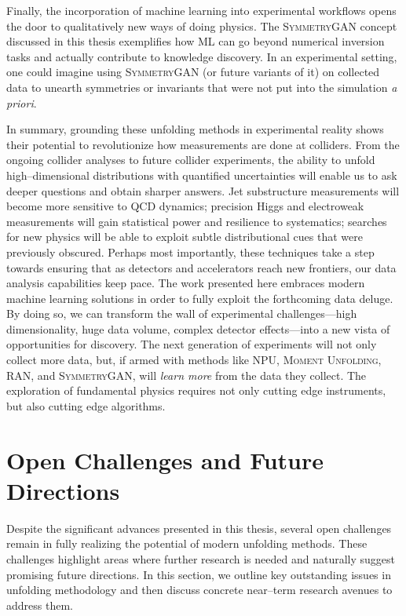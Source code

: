         Finally, the incorporation of machine learning into experimental workflows opens the door to qualitatively new ways of doing physics.
        The \textsc{SymmetryGAN} concept discussed in this thesis exemplifies how ML can go beyond numerical inversion tasks and actually contribute to {knowledge discovery}.
        In an experimental setting, one could imagine using \textsc{SymmetryGAN} (or future variants of it) on collected data to unearth symmetries or invariants that were not put into the simulation \textit{a priori}.
    
        In summary, grounding these unfolding methods in experimental reality shows their potential to revolutionize how measurements are done at colliders.
        From the ongoing collider analyses to future collider experiments, the ability to unfold high--dimensional distributions with quantified uncertainties will enable us to ask deeper questions and obtain sharper answers.
        Jet substructure measurements will become more sensitive to QCD dynamics;
        precision Higgs and electroweak measurements will gain statistical power and resilience to systematics;
        searches for new physics will be able to exploit subtle distributional cues that were previously obscured.
        Perhaps most importantly, these techniques take a step towards ensuring that as detectors and accelerators reach new frontiers, our data analysis capabilities keep pace.
        The work presented here embraces modern machine learning solutions in order to fully exploit the forthcoming data deluge.
        By doing so, we can transform the wall of experimental challenges---high dimensionality, huge data volume, complex detector effects---into a new vista of opportunities for discovery.
        The next generation of experiments will not only collect more data, but, if armed with methods like NPU, \textsc{Moment Unfolding}, RAN, and \textsc{SymmetryGAN}, will \emph{learn more} from the data they collect.
        The exploration of fundamental physics requires not only cutting edge instruments, but also cutting edge algorithms.

\section{Open Challenges and Future Directions}
    Despite the significant advances presented in this thesis, several open challenges remain in fully realizing the potential of modern unfolding methods.
    These challenges highlight areas where further research is needed and naturally suggest promising future directions.
    In this section, we outline key outstanding issues in unfolding methodology and then discuss concrete near--term research avenues to address them.
        
